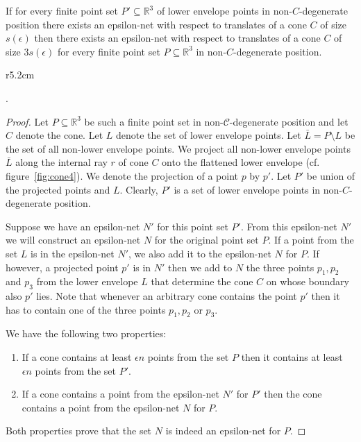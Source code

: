 \documentclass{stacs_proc}
\newcommand{\setR}{\mathbb{R}}
\newcommand{\C}{\mathcal{C}}
\begin{document}
\begin{lemma}
  \label{lem:1}
  If for every finite point set $P'\subseteq\setR^3$ of lower envelope points in
  non-$C$-degenerate position there exists 
  an epsilon-net with respect to translates of a cone $C$ of size
  $s(\epsilon)$ then there exists 
  an epsilon-net with respect to translates of a cone $C$ of size
  $3s(\epsilon)$ for every finite point 
  set  $P\subseteq\setR^3$ in non-$C$-degenerate position.
\end{lemma}
\begin{wrapfigure}[12]{r}{5.2cm}
  \begin{center}
    \caption{The projection of points onto flattened lower envelope.}
    \label{fig:cone4}
  \end{center}
\end{wrapfigure}
.\vspace{-4ex}
\begin{proof}
  Let $P\subseteq\setR^3$ be such a finite point set in non-$\C$-degenerate
  position and let $C$ denote the cone. Let $L$ denote the set of
  lower envelope points. Let $\bar{L}=P\setminus L$ be the set of all
  non-lower envelope points.   
We project all non-lower envelope points $\bar{L}$ along the
  internal ray $r$ of cone $C$ onto the flattened lower envelope
  (cf. figure~\ref{fig:cone4}). We denote the projection of a point
  $p$ by $p'$. 
  Let $P'$ be union of the projected points and $L$. Clearly, $P'$ is
  a set of lower envelope points in non-$C$-degenerate position.  

  Suppose we have an epsilon-net $N'$ for this point
  set $P'$. From this epsilon-net $N'$ we will construct an
  epsilon-net $N$ for the original point set $P$. If a point from the set
  $L$ is in the epsilon-net $N'$, we also add it to the epsilon-net
  $N$ for $P$. If however, a projected point $p'$ is in $N'$ then we
  add to $N$ the three points $p_1, p_2$ and $p_3$ from the lower envelope $L$ that determine the cone $C$ on whose boundary also $p'$ lies. Note that whenever an arbitrary cone contains the point $p'$ then it has to contain one of the three points $p_1, p_2$ or $p_3$. 



  We have the following two properties:
  \begin{enumerate}
  \item If a cone contains at least $\epsilon n$ points from the set $P$ then
    it contains at least $\epsilon n$ points from the set $P'$. 
  \item If a cone contains a point from the epsilon-net $N'$ for $P'$
    then the cone contains a point from the epsilon-net $N$ for $P$.  
  \end{enumerate}    
  Both properties prove that the 
set $N$ is indeed an epsilon-net for $P$.
\end{proof}
\end{document}

